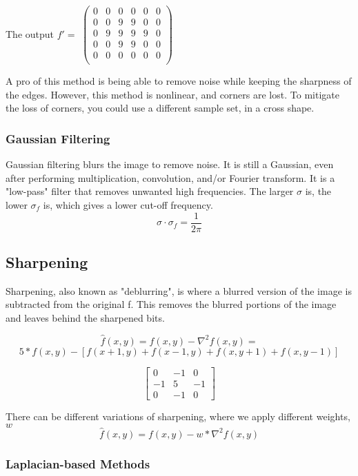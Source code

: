 \documentclass{article}
\begin{document}
\begin{multicols}{2}
The output
$f' = $
$\begin{pmatrix}
  0 & 0 & 0 & 0 & 0 & 0\\
  0 & 0 & 9 & 9 & 0 & 0\\
  0 & 9 & 9 & 9 & 9 & 0\\
  0 & 0 & 9 & 9 & 0 & 0\\
  0 & 0 & 0 & 0 & 0 & 0\\
\end{pmatrix}$

A pro of this method is being able to remove noise while keeping the sharpness of the edges. However, this method is nonlinear, and corners are lost. To mitigate the loss of corners, you could use a different sample set, in a cross shape.

\subsubsection{Gaussian Filtering}

Gaussian filtering blurs the image to remove noise. It is still a Gaussian, even after performing multiplication, convolution, and/or Fourier transform. It is a "low-pass" filter that removes unwanted high frequencies. The larger $\sigma$ is, the lower $\sigma_f$ is, which gives a lower cut-off frequency.
\[\sigma \cdot \sigma_f = \frac{1}{2\pi}\]

\subsection{Sharpening}

Sharpening, also known as "deblurring", is where a blurred version of the image is subtracted from the original f. This removes the blurred portions of the image and leaves behind the sharpened bits.

\[\hat{f}(x,y) = f(x,y) - \nabla^{2}f(x,y)=\]
\[5*f(x,y)-[f(x+1,y)+f(x-1,y)+f(x,y+1)+f(x,y-1)]\]

\[
\begin{bmatrix}
  0 & -1 & 0\\
  -1 & 5 & -1\\
  0 & -1 & 0
\end{bmatrix}
\]

There can be different variations of sharpening, where we apply different weights, \(w\)
\[\hat{f}(x,y) = f(x,y) - w * \nabla^{2}f(x,y)\]

\subsubsection{Laplacian-based Methods}


\end{multicols}
\end{document}
